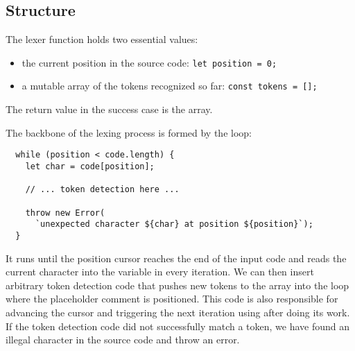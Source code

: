\subsection{Structure}
The lexer function holds two essential values:
\begin{itemize}
  \item the current position in the source code: \texttt{let position = 0;}
  \item a mutable array of the tokens recognized so far: \texttt{const tokens = [];}
\end{itemize}
The return value in the success case is the  array.

The backbone of the lexing process is formed by the loop:
\begin{verbatim}
  while (position < code.length) {
    let char = code[position];

    // ... token detection here ...

    throw new Error(
      `unexpected character ${char} at position ${position}`);
  }
\end{verbatim}
It runs until the position cursor reaches the end of the input code
and reads the current character into the  variable in every iteration.
We can then insert arbitrary token detection code that pushes new tokens to the  array
into the loop where the placeholder comment is positioned.
This code is also responsible for advancing the  cursor
and triggering the next iteration using  after doing its work.
If the token detection code did not successfully match a token,
we have found an illegal character in the source code and throw an error.
